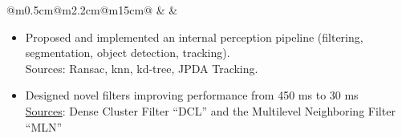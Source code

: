 \documentclass[10pt,a4paper]{article}
\begin{document}
                         
\vspace{1em}                       
\begin{tabular}{@{}m{0.5cm}@{\hspace{0.5em}}m{2.2cm}@{\hspace{0.5em}}m{15cm}@{}}
   & 
  \raisebox{1.8em}{\begin{minipage}[t]{\linewidth}
  \centering
    \textcolor{blocktitle1_color}{Sep. 21}\\
    \textcolor{blocktitle1_color}{Sep. 22}
  \end{minipage} 
  } &
\end{tabular}


\vspace{-1em}
\begin{itemize}[leftmargin=*]
  \item Proposed and implemented an internal perception pipeline (filtering, segmentation, object detection, tracking).\\ {\fontsize{10pt}{10pt}\selectfont\textcolor{blocktext2_color}{Sources: Ransac, knn, kd-tree, JPDA Tracking}}. 
  \item Designed novel filters improving performance from 450 ms to 30 ms 
  \\ {\fontsize{10pt}{10pt}\selectfont\textcolor{blocktext2_color}{{\fontsize{10pt}{10pt}\selectfont\textcolor{blocktext2_color}{\href{https://amr-aboughazala.super.site/data-analysis}{Sources}}}: Dense Cluster Filter “DCL” and the Multilevel Neighboring Filter “MLN”}}

\end{itemize}
\end{document}
